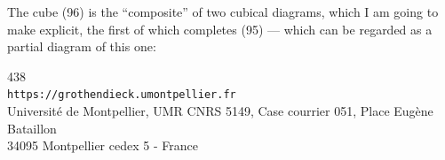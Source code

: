 \uline{} The cube (96) is the ``composite'' of two cubical
diagrams, which I am going to make explicit, the first of which completes (95) --- which can
be regarded as a partial diagram of this one:


\begin{center}
{\small
438\\
\texttt{https://grothendieck.umontpellier.fr}\\
Université de Montpellier, UMR CNRS 5149, Case courrier 051, Place Eugène Bataillon\\
34095 Montpellier cedex 5 - France
}
\end{center}